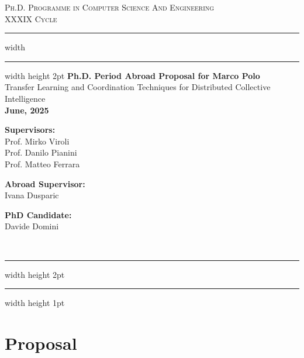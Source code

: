 \documentclass[12pt]{article}
\begin{document}
\begin{titlepage}

	\newcommand{\HRule}{\rule{\linewidth}{0.5mm}}
	\center
	
	\textsc{\Large Ph.D. Programme in Computer Science And Engineering}\\[0.5cm]
	
	\textsc{\Large XXXIX Cycle}\\[0.6cm]
	
	\hrule width \hsize \kern 1mm \hrule width \hsize height 2pt 
	\vspace{0.8cm}
	{ \large \bfseries Ph.D. Period Abroad Proposal for Marco Polo}\\[0.6cm]
	{ \large Transfer Learning and Coordination Techniques for Distributed Collective Intelligence }\\[0.6cm]

	\bfseries{June, 2025}


    \vspace{1.5cm}
    
    \noindent
    \begin{minipage}[t]{0.3\textwidth}
        \raggedright
        \textbf{Supervisors:}\\[0.5cm]
        Prof. Mirko Viroli\\
        Prof. Danilo Pianini\\
        Prof. Matteo Ferrara
    \end{minipage}%
	\hfill
    \begin{minipage}[t]{0.3\textwidth}
        \centering
        \textbf{Abroad Supervisor:}\\[0.5cm]
        Ivana Dusparic 
    \end{minipage}
    \hfill
    \begin{minipage}[t]{0.3\textwidth}
        \raggedleft
        \textbf{PhD Candidate:}\\[0.5cm]
        Davide Domini
    \end{minipage} \\[0.6cm]

	\hrule width \hsize height 2pt \kern 1mm \hrule width \hsize height 1pt
	\vspace{0.4cm}

\end{titlepage}

\section{Proposal}\label{sec:intro}
\end{document}
